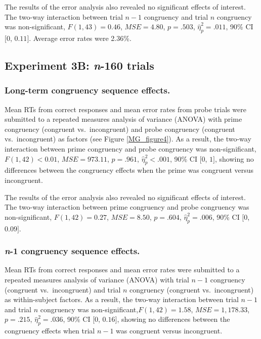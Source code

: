 \documentclass[]{DissertateCUNY}
\begin{document}
The results of the error analysis also revealed no significant effects
of interest. The two-way interaction between trial \(n-1\) congruency
and trial \(n\) congruency was non-significant, \(F(1, 43) = 0.46\),
\(\mathit{MSE} = 4.80\), \(p = .503\), \(\hat{\eta}^2_p = .011\), 90\%
CI \([0\), \(0.11]\). Average error rates were 2.36\%.

\hypertarget{experiment-3b--160-trials}{%
\subsection{\texorpdfstring{Experiment 3B: \textit{n}-160
trials}{Experiment 3B: -160 trials}}\label{experiment-3b--160-trials}}

\hypertarget{long-term-congruency-sequence-effects.-3}{%
\subsubsection{Long-term congruency sequence
effects.}\label{long-term-congruency-sequence-effects.-3}}

Mean RTs from correct responses and mean error rates from probe trials
were submitted to a repeated measures analysis of variance (ANOVA) with
prime congruency (congruent vs.~incongruent) and probe congruency
(congruent vs.~incongruent) as factors (see Figure \ref{MG_figure4}). As
a result, the two-way interaction between prime congruency and probe
congruency was non-significant, \(F(1, 42) < 0.01\),
\(\mathit{MSE} = 973.11\), \(p = .961\), \(\hat{\eta}^2_p < .001\), 90\%
CI \([0\), \(1]\), showing no differences between the congruency effects
when the prime was congruent versus incongruent.

The results of the error analysis also revealed no significant effects
of interest. The two-way interaction between prime congruency and probe
congruency was non-significant, \(F(1, 42) = 0.27\),
\(\mathit{MSE} = 8.50\), \(p = .604\), \(\hat{\eta}^2_p = .006\), 90\%
CI \([0\), \(0.09]\).

\hypertarget{congruency-sequence-effects.-4}{%
\subsubsection{\texorpdfstring{\textit{n}-1 congruency sequence
effects.}{-1 congruency sequence effects.}}\label{congruency-sequence-effects.-4}}

Mean RTs from correct responses and mean error rates were submitted to a
repeated measures analysis of variance (ANOVA) with trial \(n-1\)
congruency (congruent vs.~incongruent) and trial \(n\) congruency
(congruent vs.~incongruent) as within-subject factors. As a result, the
two-way interaction between trial \(n-1\) and trial \(n\) congruency was
non-significant,\(F(1, 42) = 1.58\), \(\mathit{MSE} = 1,178.33\),
\(p = .215\), \(\hat{\eta}^2_p = .036\), 90\% CI \([0\), \(0.16]\),
showing no differences between the congruency effects when trial \(n-1\)
was congruent versus incongruent.
\end{document}
